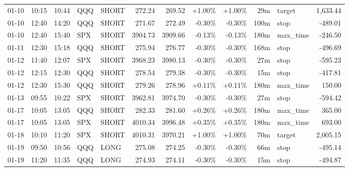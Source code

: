 \documentclass[11pt,a4paper,twoside]{article}
\begin{document}
\begin{center}
\begin{longtable}{>{\color{txtmain}}l l l l l r r r r r >{\color{txtmain}}l r}
01-10 & 10:15 & 10:44 & QQQ & SHORT & 272.24 & 269.52 & \textcolor{wingreen}{+1.00\%} & \textcolor{wingreen}{+1.00\%} & 29m & target & \textcolor{wingreen}{1,633.44} \\
01-10 & 12:40 & 14:20 & QQQ & SHORT & 271.67 & 272.49 & \textcolor{lossred}{-0.30\%} & \textcolor{lossred}{-0.30\%} & 100m & stop & \textcolor{lossred}{-489.01} \\
01-10 & 12:40 & 15:40 & SPX & SHORT & 3904.73 & 3909.66 & \textcolor{lossred}{-0.13\%} & \textcolor{lossred}{-0.13\%} & 180m & max\_time & \textcolor{lossred}{-246.50} \\
01-11 & 12:30 & 15:18 & QQQ & SHORT & 275.94 & 276.77 & \textcolor{lossred}{-0.30\%} & \textcolor{lossred}{-0.30\%} & 168m & stop & \textcolor{lossred}{-496.69} \\
01-12 & 11:40 & 12:07 & SPX & SHORT & 3968.23 & 3980.13 & \textcolor{lossred}{-0.30\%} & \textcolor{lossred}{-0.30\%} & 27m & stop & \textcolor{lossred}{-595.23} \\
01-12 & 12:15 & 12:30 & QQQ & SHORT & 278.54 & 279.38 & \textcolor{lossred}{-0.30\%} & \textcolor{lossred}{-0.30\%} & 15m & stop & \textcolor{lossred}{-417.81} \\
01-12 & 12:30 & 15:30 & QQQ & SHORT & 279.26 & 278.96 & \textcolor{wingreen}{+0.11\%} & \textcolor{wingreen}{+0.11\%} & 180m & max\_time & \textcolor{wingreen}{150.00} \\
01-13 & 09:55 & 10:22 & SPX & SHORT & 3962.81 & 3974.70 & \textcolor{lossred}{-0.30\%} & \textcolor{lossred}{-0.30\%} & 27m & stop & \textcolor{lossred}{-594.42} \\
01-17 & 10:05 & 13:05 & QQQ & SHORT & 282.33 & 281.60 & \textcolor{wingreen}{+0.26\%} & \textcolor{wingreen}{+0.26\%} & 180m & max\_time & \textcolor{wingreen}{365.00} \\
01-17 & 10:05 & 13:05 & SPX & SHORT & 4010.34 & 3996.48 & \textcolor{wingreen}{+0.35\%} & \textcolor{wingreen}{+0.35\%} & 180m & max\_time & \textcolor{wingreen}{693.00} \\
01-18 & 10:10 & 11:20 & SPX & SHORT & 4010.31 & 3970.21 & \textcolor{wingreen}{+1.00\%} & \textcolor{wingreen}{+1.00\%} & 70m & target & \textcolor{wingreen}{2,005.15} \\
01-19 & 09:50 & 10:56 & QQQ & LONG & 275.08 & 274.25 & \textcolor{lossred}{-0.30\%} & \textcolor{lossred}{-0.30\%} & 66m & stop & \textcolor{lossred}{-495.14} \\
01-19 & 11:20 & 11:35 & QQQ & LONG & 274.93 & 274.11 & \textcolor{lossred}{-0.30\%} & \textcolor{lossred}{-0.30\%} & 15m & stop & \textcolor{lossred}{-494.87} \\

\end{longtable}
\end{center}
\end{document}
